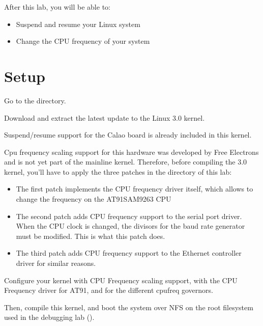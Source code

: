 
After this lab, you will be able to:

\begin{itemize}
\item Suspend and resume your Linux system
\item Change the CPU frequency of your system
\end{itemize}

\section{Setup}

Go to the  directory.

Download and extract the latest update to the Linux 3.0 kernel.

Suspend/resume support for the Calao board is already included in this
kernel.

Cpu frequency scaling support for this hardware was developed by Free
Electrons and is not yet part of the mainline kernel. Therefore,
before compiling the 3.0 kernel, you'll have to apply the three
patches in the  directory of this lab:

\begin{itemize}

\item The first patch implements the CPU frequency driver itself,
  which allows to change the frequency on the AT91SAM9263 CPU

\item The second patch adds CPU frequency support to the serial port
  driver. When the CPU clock is changed, the divisors for the baud
  rate generator must be modified. This is what this patch does.

\item The third patch adds CPU frequency support to the Ethernet
  controller driver for similar reasons.

\end{itemize}

Configure your kernel with CPU Frequency scaling support, with the CPU
Frequency driver for AT91, and for the different cpufreq governors.

Then, compile this kernel, and boot the system over NFS on the root 
filesystem used in the debugging lab ().

